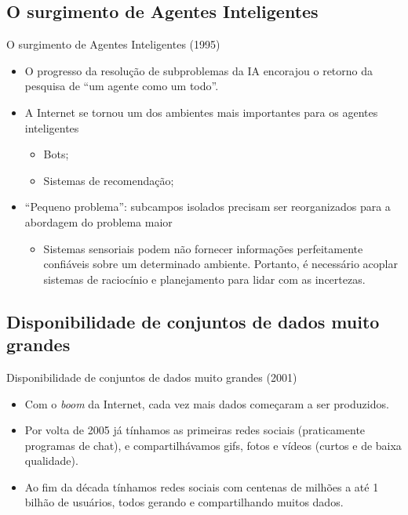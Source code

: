 \documentclass{libs/ufc_format}
\begin{document}
\subsection{O surgimento de Agentes Inteligentes}

\begin{frame}{O surgimento de Agentes Inteligentes (1995)}
    \begin{itemize}
        \justifying
        \item O progresso da resolução de subproblemas da IA encorajou o retorno da pesquisa de ``um agente como um todo''.
        \item A Internet se tornou um dos ambientes mais importantes para os agentes inteligentes
            \begin{itemize}
                \justifying
                \item<2> Bots;
                \item<2> Sistemas de recomendação;
            \end{itemize}
        \item<3-> ``Pequeno problema'': subcampos isolados precisam ser reorganizados para a abordagem do problema maior
            \begin{itemize}
                \justifying
                \item<4> Sistemas sensoriais podem não fornecer informações perfeitamente confiáveis sobre um determinado ambiente. Portanto, é necessário acoplar sistemas de raciocínio e planejamento para lidar com as incertezas.
            \end{itemize}
    \end{itemize}
\end{frame}

\subsection{Disponibilidade de conjuntos de dados muito grandes}

\begin{frame}{Disponibilidade de conjuntos de dados muito grandes (2001)}
    \begin{itemize}
        \justifying
        \item Com o \textit{boom} da Internet, cada vez mais dados começaram a ser produzidos.
        \item Por volta de 2005 já tínhamos as primeiras redes sociais (praticamente programas de chat), e compartilhávamos gifs, fotos e vídeos (curtos e de baixa qualidade).
        \item Ao fim da década tínhamos redes sociais com centenas de milhões a até 1 bilhão de usuários, todos gerando e compartilhando muitos dados.
    \end{itemize}
\end{frame}
\end{document}
